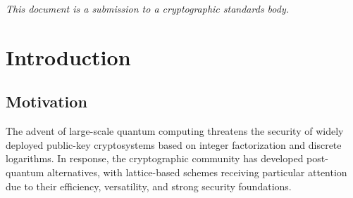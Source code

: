 \documentclass[11pt,a4paper]{article}
\newcommand{\polarKem}{\textsf{Polar-KEM}\xspace}
\begin{document}
\begin{titlepage}
\begin{abstract}
\noindent
This document presents \polarKem, a post-quantum Key Encapsulation Mechanism (KEM) whose security is based on the Lattice Isomorphism Problem (LIP) over polar-code-defined lattices. Polar lattices, constructed via Construction~D from nested polar codes, admit efficient and reliable bounded-distance decoding using the successive cancellation (SC) decoder, enabling a clean separation between correct decryption and hard lattice problems. \polarKem builds on the blueprint of LIP-based cryptography but departs from prior constructions by using polar lattices instead of Barnes-Wall or orthogonal lattices, yielding improved decoding efficiency and concrete security estimates. The scheme is designed for IND-CCA2 security in the quantum random oracle model via a Fujisaki-Okamoto transform with implicit rejection. We propose three parameter sets---\textsf{PolarKEM-128}, \textsf{PolarKEM-256}, and \textsf{PolarKEM-512}---targeting NIST security levels 1, 3, and 5 respectively. Our analysis suggests that \polarKem achieves competitive key and ciphertext sizes while offering a novel security assumption based on the hardness of the polar-LIP problem.
\end{abstract}

\vfill
{\small\textit{This document is a submission to a cryptographic standards body.}}

\end{titlepage}

\tableofcontents
\newpage

\section{Introduction}\label{sec:intro}

\subsection{Motivation}\label{sec:motivation}

The advent of large-scale quantum computing threatens the security of widely deployed public-key cryptosystems based on integer factorization and discrete logarithms. In response, the cryptographic community has developed post-quantum alternatives, with lattice-based schemes receiving particular attention due to their efficiency, versatility, and strong security foundations.
\end{document}
